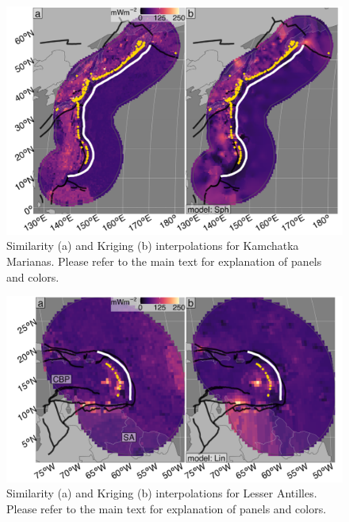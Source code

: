 \begin{figure}[htbp]

{\centering \includegraphics[width=1\linewidth,]{assets/figs/chpt3/KamchatkaMarianasDiffComp} 

}

\caption[Similarityand Kriging interpolations for Kamchatka Marianas]{Similarity (a) and Kriging (b) interpolations for Kamchatka Marianas. Please refer to the main text for explanation of panels and colors.}\label{fig:kamchatkaMarianasDiff}
\end{figure}

\begin{figure}[htbp]

{\centering \includegraphics[width=1\linewidth,]{assets/figs/chpt3/LesserAntillesDiffComp} 

}

\caption[Similarityand Kriging interpolations for Lesser Antilles]{Similarity (a) and Kriging (b) interpolations for Lesser Antilles. Please refer to the main text for explanation of panels and colors.}\label{fig:lesserAntillesDiff}
\end{figure}

